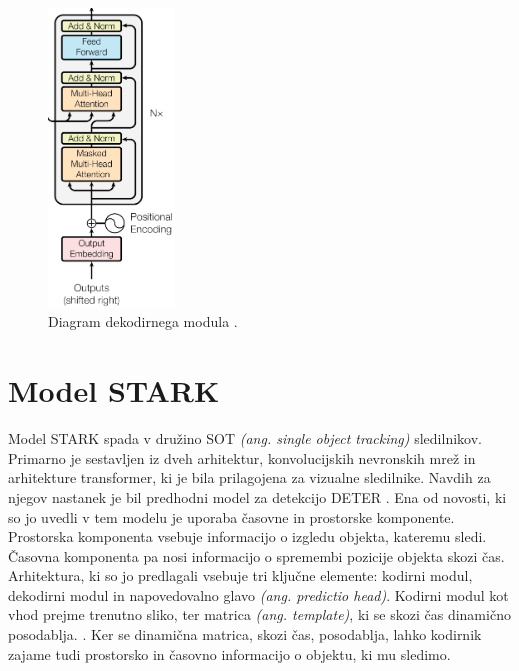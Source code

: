 \documentclass[a4paper,12pt,openright]{book}
\begin{document}
\begin{figure}[htb]
    \begin{center}
        \includegraphics[width=0.3\textwidth]{img/decoder.png}
    \end{center}
    \caption{Diagram dekodirnega modula \cite{attention_is_all_you_need}.}
    \label{img:decoder}
\end{figure}

\section{Model STARK}
\label{sec:stark}
Model STARK \cite{stark} spada v družino SOT \emph{(ang. single object tracking)} sledilnikov. Primarno je sestavljen iz dveh arhitektur, konvolucijskih nevronskih mrež in arhitekture transformer, ki je bila prilagojena za vizualne sledilnike. Navdih za njegov nastanek je bil predhodni model za detekcijo DETER \cite{deter}. Ena od novosti, ki so jo uvedli v tem modelu je uporaba časovne in prostorske komponente. Prostorska komponenta vsebuje informacijo o izgledu objekta, kateremu sledi. Časovna komponenta pa nosi informacijo o spremembi pozicije objekta skozi čas.
Arhitektura, ki so jo predlagali vsebuje tri ključne elemente: kodirni modul, dekodirni modul in napovedovalno glavo \emph{(ang. predictio head)}. Kodirni modul kot vhod prejme trenutno sliko, ter matrica \emph{(ang. template)}, ki se skozi čas dinamično posodablja. . Ker se dinamična matrica, skozi čas, posodablja, lahko kodirnik zajame tudi prostorsko in časovno informacijo o objektu, ki mu sledimo.
\end{document}
